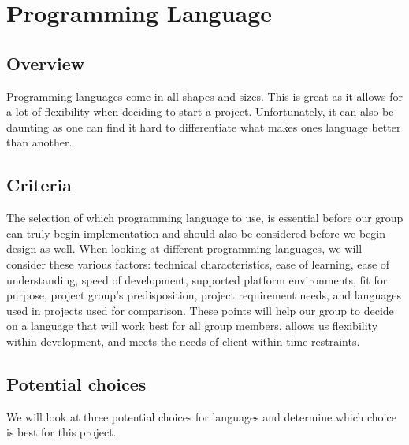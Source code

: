       

\section{ Programming Language }

\subsection{ Overview }
Programming languages come in all shapes and sizes. This is great as it allows for a lot of flexibility when deciding to start a project. Unfortunately, it can also be daunting as one can find it hard to differentiate what makes ones language better than another.  

\subsection{ Criteria }
The selection of which programming language to use, is essential before our group can truly begin implementation and should also be considered before we begin design as well. When looking at different programming languages, we will consider these various factors: technical characteristics, ease of learning, ease of understanding, speed of development, supported platform environments, fit for purpose, project group’s predisposition, project requirement needs, and languages used in projects used for comparison. 
These points will help our group to decide on a language that will work best for all group members, allows us flexibility within development, and meets the needs of client within time restraints. 


\subsection{ Potential choices }
We will look at three potential choices for languages and determine which choice is best for this project. 

